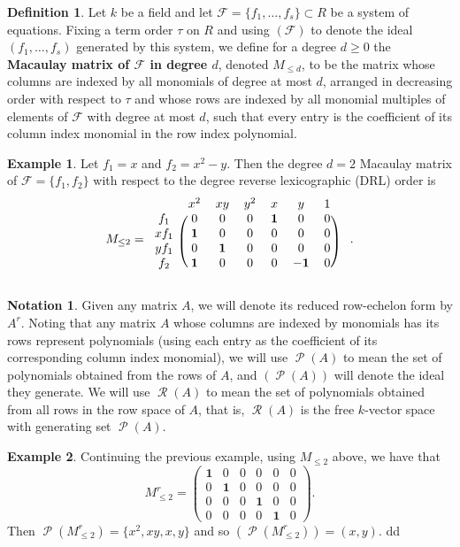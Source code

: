 \documentclass[11pt]{article}
\newcommand{\F}{\mathcal{F}}
\DeclareMathOperator{\Poly}{\mathscr{P}}
\DeclareMathOperator{\Row}{\mathscr{R}}
\theoremstyle{definition}
\newtheorem{definition}{Definition}
\newtheorem{example}{Example}
\newtheorem*{notation}{Notation}
\begin{document}
\begin{definition}
	Let $k$ be a field and let $\F = \{f_1, \dots, f_s\} \subset R$ be a system of equations. Fixing a term order $\tau$ on $R$ and using $(\F)$ to denote the ideal $(f_1, \dots, f_s)$ generated by this system, we define for a degree $d \geq 0$ the \textbf{Macaulay matrix of $\F$ in degree $d$}, denoted $M_{\leq d}$, to be the matrix whose columns are indexed by all monomials of degree at most $d$, arranged in decreasing order with respect to $\tau$ and whose rows are indexed by all monomial multiples of elements of $\F$ with degree at most $d$, such that every entry is the coefficient of its column index monomial in the row index polynomial.  
\end{definition}


\begin{example}
	Let $f_1 = x$ and $f_2 = x^2 - y$. Then the degree $d = 2$ Macaulay matrix of $\F = \{f_1, f_2\}$ with respect to the degree reverse lexicographic (DRL) order is \[ M_{\leq 2} = \begin{blockarray}{ccccccc}
    & x^2 & xy & y^2 & x & y & 1 \\
    \begin{block}{c(cccccc)}
        f_1 & 0 & 0 & 0 & \mathbf{1} & 0 & 0 \\
        xf_1 & \mathbf{1} & 0 & 0 & 0 & 0 & 0 \\
        yf_1 & 0 & \mathbf{1} & 0 & 0 & 0 & 0 \\
        f_2 & \mathbf{1} & 0 & 0 & 0 & \mathbf{-1} & 0 \\
    \end{block}
\end{blockarray} \quad . \]
\end{example}


\begin{notation}
	Given any matrix $A$, we will denote its reduced row-echelon form by $A^r$. Noting that any matrix $A$ whose columns are indexed by monomials has its rows represent polynomials (using each entry as the coefficient of its corresponding column index monomial), we will use $\Poly(A)$ to mean the set of polynomials obtained from the rows of $A$, and $(\Poly(A))$ will denote the ideal they generate. We will use $\Row(A)$ to mean the set of polynomials obtained from all rows in the row space of $A$, that is, $\Row(A)$ is the free $k$-vector space with generating set $\Poly(A)$.  
\end{notation}


\begin{example}
	Continuing the previous example, using $M_{\leq 2}$ above, we have that \[ M_{\leq 2}^r = \begin{pmatrix}
		\mathbf{1} & 0 & 0 & 0 & 0 & 0 \\
		0 & \mathbf{1} & 0 & 0 & 0 & 0 \\
		0 & 0 & 0 & \mathbf{1} & 0 & 0 \\
		0 & 0 & 0 & 0 & \mathbf{1} & 0
	\end{pmatrix}. \] Then $\Poly(M_{\leq 2}^r) = \{x^2, xy, x, y\}$ and so $(\Poly(M_{\leq 2}^r)) = (x,y)$. dd
\end{example}
\end{document}
